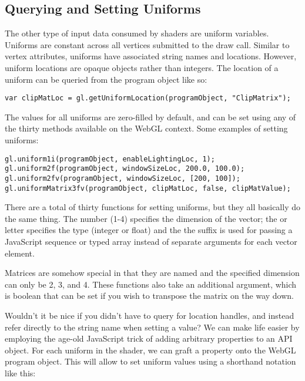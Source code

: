 \subsection{Querying and Setting Uniforms}

The other type of input data consumed by shaders are uniform variables.  Uniforms are constant across all vertices submitted to the draw call.  Similar to vertex attributes, uniforms have associated string names and locations.  However, uniform locations are opaque objects rather than integers.  The location of a uniform can be queried from the program object like so:

\begin{lstlisting}
var clipMatLoc = gl.getUniformLocation(programObject, "ClipMatrix");
\end{lstlisting}

The values for all uniforms are zero-filled by default, and can be set using any of the thirty  methods available on the WebGL context.  Some examples of setting uniforms:

\begin{lstlisting}
gl.uniform1i(programObject, enableLightingLoc, 1);
gl.uniform2f(programObject, windowSizeLoc, 200.0, 100.0);
gl.uniform2fv(programObject, windowSizeLoc, [200, 100]);
gl.uniformMatrix3fv(programObject, clipMatLoc, false, clipMatValue);
\end{lstlisting}

There are a total of thirty functions for setting uniforms, but they all basically do the same thing.  The number (1-4) specifies the dimension of the vector; the  or  letter specifies the type (integer or float) and the the  suffix is used for passing a JavaScript sequence or typed array instead of separate arguments for each vector element.

Matrices are somehow special in that they are named  and the specified dimension can only be 2, 3, and 4.  These functions also take an additional argument, which is boolean that can be set if you wish to transpose the matrix on the way down.

Wouldn't it be nice if you didn't have to query for location handles, and instead refer directly to the string name when setting a value?  We can make life easier by employing the age-old JavaScript trick of adding arbitrary properties to an API object.  For each uniform in the shader, we can graft a property onto the WebGL program object.  This will allow to set uniform values using a shorthand notation like this:

